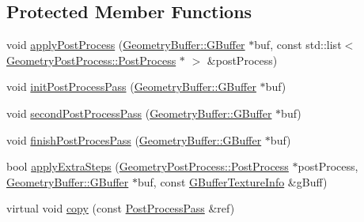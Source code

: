 \subsection*{Protected Member Functions}
\begin{DoxyCompactItemize}
\item 
void \mbox{\hyperlink{class_geometry_engine_1_1_geometry_render_step_1_1_post_process_pass_ac0f109e5dc7fb598c2613daaff285526}{apply\+Post\+Process}} (\mbox{\hyperlink{class_geometry_engine_1_1_geometry_buffer_1_1_g_buffer}{Geometry\+Buffer\+::\+G\+Buffer}} $\ast$buf, const std\+::list$<$ \mbox{\hyperlink{class_geometry_engine_1_1_geometry_post_process_1_1_post_process}{Geometry\+Post\+Process\+::\+Post\+Process}} $\ast$ $>$ \&post\+Process)
\item 
void \mbox{\hyperlink{class_geometry_engine_1_1_geometry_render_step_1_1_post_process_pass_ae0bfafe4123decb5eb65e1decc3c07ba}{init\+Post\+Process\+Pass}} (\mbox{\hyperlink{class_geometry_engine_1_1_geometry_buffer_1_1_g_buffer}{Geometry\+Buffer\+::\+G\+Buffer}} $\ast$buf)
\item 
void \mbox{\hyperlink{class_geometry_engine_1_1_geometry_render_step_1_1_post_process_pass_a3d555943a9bc2b3105e71b8984b1ce0b}{second\+Post\+Process\+Pass}} (\mbox{\hyperlink{class_geometry_engine_1_1_geometry_buffer_1_1_g_buffer}{Geometry\+Buffer\+::\+G\+Buffer}} $\ast$buf)
\item 
void \mbox{\hyperlink{class_geometry_engine_1_1_geometry_render_step_1_1_post_process_pass_abfc2e269aad1157916f6c3c72b570ae9}{finish\+Post\+Proces\+Pass}} (\mbox{\hyperlink{class_geometry_engine_1_1_geometry_buffer_1_1_g_buffer}{Geometry\+Buffer\+::\+G\+Buffer}} $\ast$buf)
\item 
bool \mbox{\hyperlink{class_geometry_engine_1_1_geometry_render_step_1_1_post_process_pass_ac476adc4f25eb910c2980de4561a65da}{apply\+Extra\+Steps}} (\mbox{\hyperlink{class_geometry_engine_1_1_geometry_post_process_1_1_post_process}{Geometry\+Post\+Process\+::\+Post\+Process}} $\ast$post\+Process, \mbox{\hyperlink{class_geometry_engine_1_1_geometry_buffer_1_1_g_buffer}{Geometry\+Buffer\+::\+G\+Buffer}} $\ast$buf, const \mbox{\hyperlink{class_geometry_engine_1_1_g_buffer_texture_info}{G\+Buffer\+Texture\+Info}} \&g\+Buff)
\item 
virtual void \mbox{\hyperlink{class_geometry_engine_1_1_geometry_render_step_1_1_post_process_pass_a5279399395c18ac4ef35fa3028aa4950}{copy}} (const \mbox{\hyperlink{class_geometry_engine_1_1_geometry_render_step_1_1_post_process_pass}{Post\+Process\+Pass}} \&ref)
\end{DoxyCompactItemize}


